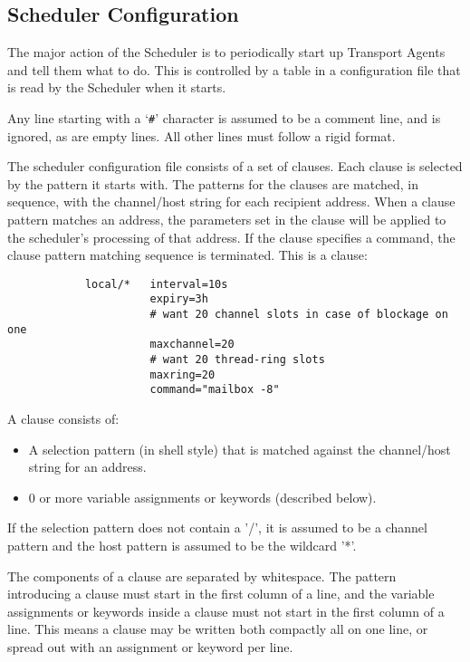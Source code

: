 \subsection{Scheduler Configuration}





The major action of the Scheduler is to periodically start up Transport
Agents and tell them what to do.  This is controlled by a table in a
configuration file that is read by the Scheduler when it starts.  

Any line starting with a `{\tt \#}' character is assumed to be a comment 
line, and is ignored, as are empty lines.  All other lines must follow a rigid
format. 

The scheduler configuration file consists of a set  of
clauses. Each clause is selected by the pattern it starts
with. The patterns  for  the  clauses   are  matched,  in
sequence, with the channel/host string for each recipient
address. When a clause pattern matches  an  address,  the
parameters set in the clause will be applied to the scheduler's 
processing of that address. If the clause specifies a command,  
the clause pattern matching sequence is terminated. This is a clause:

\begin{tscreen}
\begin{verbatim}
            local/*   interval=10s
                      expiry=3h
                      # want 20 channel slots in case of blockage on one
                      maxchannel=20
                      # want 20 thread-ring slots
                      maxring=20
                      command="mailbox -8"
\end{verbatim}
\end{tscreen}


A clause consists of:

\begin{itemize}
\item A selection pattern  (in  shell style) that  is
matched  against        the  channel/host  string  for an
address.
\item 0  or more  variable assignments or keywords
(described below).
\end{itemize}


If the selection pattern does not contain a '/', it is
assumed to be a channel pattern and the host  pattern  is
assumed to be the wildcard '*'.

The components of a clause are separated by whitespace.
The pattern introducing a clause must start in the first
column of a line, and the variable assignments or keywords
inside a clause must not start in the first  column of a
line. This means a clause may be written both compactly
all on one line, or spread out with an assignment or keyword per line.

